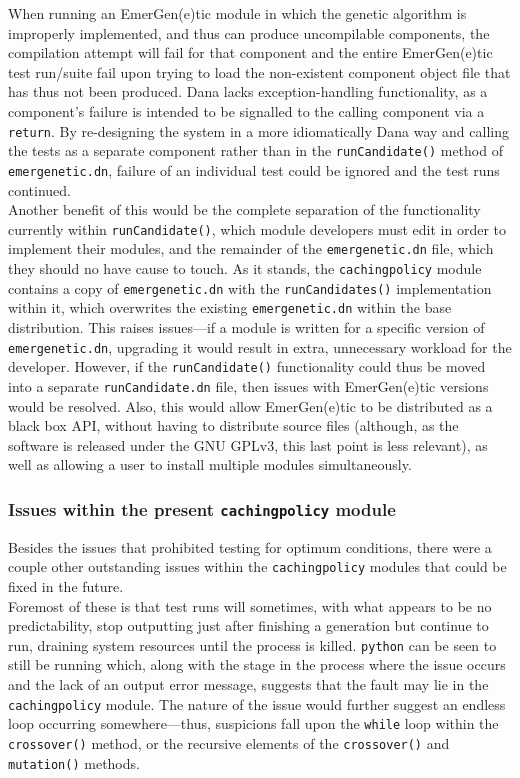\documentclass[compsoc,12pt,a4paper]{IEEEtran}
\begin{document}
				When running an EmerGen(e)tic module in which the genetic algorithm is improperly implemented, and thus can produce uncompilable components, the compilation attempt will fail for that component and the entire EmerGen(e)tic test run/suite fail upon trying to load the non-existent component object file that has thus not been produced. Dana lacks exception-handling functionality, as a component's failure is intended to be signalled to the calling component via a \lstinline|return|. By re-designing the system in a more idiomatically Dana way and calling the tests as a separate component rather than in the \lstinline|runCandidate()| method of \lstinline|emergenetic.dn|, failure of an individual test could be ignored and the test runs continued.\\
				Another benefit of this would be the complete separation of the functionality currently within \lstinline|runCandidate()|, which module developers must edit in order to implement their modules, and the remainder of the \lstinline|emergenetic.dn| file, which they should no have cause to touch. As it stands, the \lstinline|cachingpolicy| module contains a copy of \lstinline|emergenetic.dn| with the \lstinline|runCandidates()| implementation within it, which overwrites the existing \lstinline|emergenetic.dn| within the base distribution. This raises issues---if a module is written for a specific version of \lstinline|emergenetic.dn|, upgrading it would result in extra, unnecessary workload for the developer. However, if the \lstinline|runCandidate()| functionality could thus be moved into a separate \lstinline|runCandidate.dn| file, then issues with EmerGen(e)tic versions would be resolved. Also, this would allow EmerGen(e)tic to be distributed as a black box API, without having to distribute source files (although, as the software is released under the GNU GPLv3, this last point is less relevant), as well as allowing a user to install multiple modules simultaneously.
				
			\subsubsection{Issues within the present \lstinline|cachingpolicy| module}
			
				Besides the issues that prohibited testing for optimum conditions, there were a couple other outstanding issues within the \lstinline|cachingpolicy| modules that could be fixed in the future.\\
				Foremost of these is that test runs will sometimes, with what appears to be no predictability, stop outputting just after finishing a generation but continue to run, draining system resources until the process is killed. \lstinline|python| can be seen to still be running which, along with the stage in the process where the issue occurs and the lack of an output error message, suggests that the fault may lie in the \lstinline|cachingpolicy| module. The nature of the issue would further suggest an endless loop occurring somewhere---thus, suspicions fall upon the \lstinline|while| loop within the \lstinline|crossover()| method, or the recursive elements of the \lstinline|crossover()| and \lstinline|mutation()| methods.
				
\end{document}
